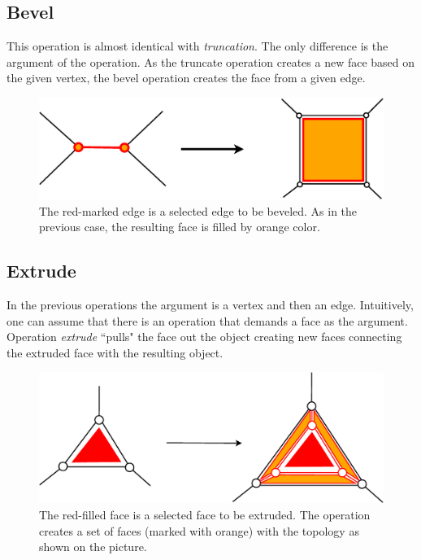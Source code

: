 \subsection{Bevel}

This operation is almost identical with \emph{truncation}. The only difference is the argument of the
operation. As the truncate operation creates a new face based on the given vertex, the bevel operation
creates the face from a given edge.\\

\begin{figure}[ht]
\centering
\includegraphics[scale=0.2]{../img/bevel.eps}
\caption{The red-marked edge is a selected edge to be beveled. As in the previous case, the resulting
face is filled by orange color.}
\end{figure}

\subsection{Extrude}

In the previous operations the argument is a vertex and then an edge. Intuitively, one can assume
that there is an operation that demands a face as the argument. Operation \emph{extrude} ``pulls"
the face out the object creating new faces connecting the extruded face with the resulting object.

\begin{figure}[ht]
\centering
\includegraphics[scale=0.2]{../img/extrude.eps}
\caption{The red-filled face is a selected face to be extruded. The operation creates a set of
faces (marked with orange) with the topology as shown on the picture.}
\end{figure}

